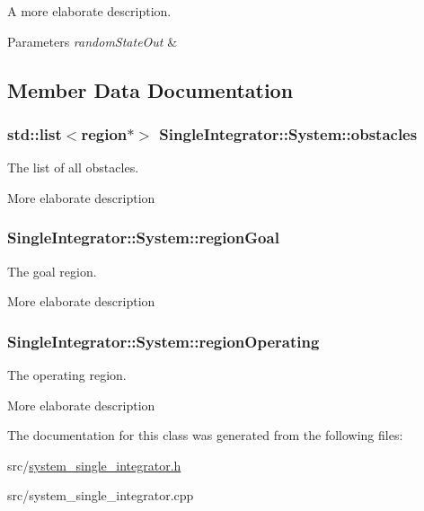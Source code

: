 A more elaborate description.


\begin{DoxyParams}{Parameters}
{\em random\-State\-Out} & \\
\hline
\end{DoxyParams}


\subsection{Member Data Documentation}
\hypertarget{class_single_integrator_1_1_system_a96c9a62c201376a973ef1e6df66e9f2a}{
\subsubsection[{obstacles}]{\setlength{\rightskip}{0pt plus 5cm}std\-::list$<${\bf region}$\ast$$>$ Single\-Integrator\-::\-System\-::obstacles}}\label{class_single_integrator_1_1_system_a96c9a62c201376a973ef1e6df66e9f2a}


The list of all obstacles. 

More elaborate description \hypertarget{class_single_integrator_1_1_system_a8d2b26130eb5f1eeedd1e5e9ca60fcb5}{
\subsubsection[{region\-Goal}]{ Single\-Integrator\-::\-System\-::region\-Goal}}\label{class_single_integrator_1_1_system_a8d2b26130eb5f1eeedd1e5e9ca60fcb5}


The goal region. 

More elaborate description \hypertarget{class_single_integrator_1_1_system_a5e8c414d1dee683eb89a241feae1adda}{
\subsubsection[{region\-Operating}]{ Single\-Integrator\-::\-System\-::region\-Operating}}\label{class_single_integrator_1_1_system_a5e8c414d1dee683eb89a241feae1adda}


The operating region. 

More elaborate description 

The documentation for this class was generated from the following files\-:\begin{DoxyCompactItemize}
\item 
src/\hyperlink{system__single__integrator_8h}{system\-\_\-single\-\_\-integrator.\-h}\item 
src/system\-\_\-single\-\_\-integrator.\-cpp\end{DoxyCompactItemize}
